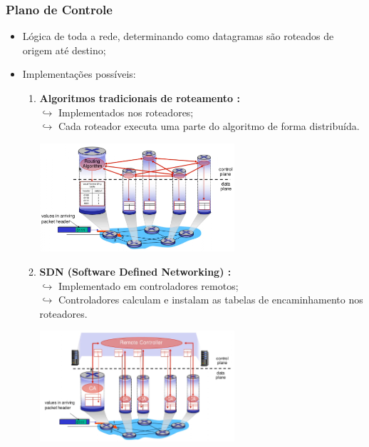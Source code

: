         \subsubsection*{Plano de Controle}
            \begin{itemize}[left=0.5cm, align=left, nosep]
                \item Lógica de toda a rede, determinando como datagramas são roteados de origem até destino;
                \item Implementações possíveis:
                
                \begin{enumerate}[left=0.5cm, align=left, nosep]
                    
                    \item \textbf{Algoritmos tradicionais de roteamento :} \\
                        $\hookrightarrow$ Implementados nos roteadores; \\
                        $\hookrightarrow$ Cada roteador executa uma parte do algoritmo de forma distribuída.
                    
                    \begin{center}
                        \includegraphics[width=0.6\textwidth]{img/cap-04/algorimo-roteamento.png}
                    \end{center}
                    
                    \item \textbf{SDN (Software Defined Networking) :} \\
                        $\hookrightarrow$ Implementado em controladores remotos; \\
                        $\hookrightarrow$ Controladores calculam e instalam as tabelas de encaminhamento nos roteadores.
                    
                    \begin{center}
                        \includegraphics[width=0.6\textwidth]{img/cap-04/sdn.png}
                    \end{center}
                

\end{enumerate}
\end{itemize}
